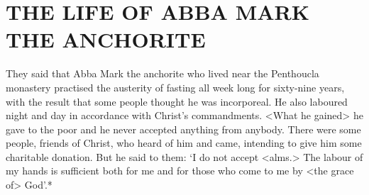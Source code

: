 \chapter{THE LIFE OF ABBA MARK THE ANCHORITE}

They said that Abba Mark the anchorite who lived near the Penthoucla monastery practised the austerity of fasting all week long for sixty-nine years, with the result that some people thought he was incorporeal.
He also laboured night and day in accordance with Christ's commandments.
<What he gained> he gave to the poor and he never accepted anything from anybody.
There were some people, friends of Christ, who heard of him and came, intending to give him some charitable donation.
But he said to them: `I do not accept <alms.>
The labour of my hands is sufficient both for me and for those who come to me by <the grace of> God'.*

